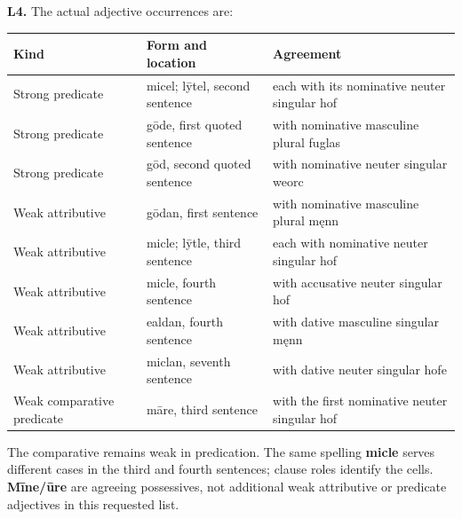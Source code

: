 \par\begin{minipage}{\linewidth}\raggedright
\textbf{L4.} The actual adjective occurrences are:

\par\begingroup
\fontsize{10.5}{13.2}\selectfont
\setlength{\LTleft}{0pt}\setlength{\LTright}{\fill}
\noindent
\begin{tabular}{@{}>{\raggedright\arraybackslash}p{34.47mm}>{\raggedright\arraybackslash}p{33.89mm}>{\raggedright\arraybackslash}p{50.01mm}@{}}
\toprule
\textbf{Kind} & \textbf{Form and location} & \textbf{Agreement} \\
\midrule
Strong predicate & micel; lȳtel, second sentence & each with its nominative neuter singular hof \\
Strong predicate & gōde, first quoted sentence & with nominative masculine plural fuglas \\
Strong predicate & gōd, second quoted sentence & with nominative neuter singular weorc \\
Weak attributive & gōdan, first sentence & with nominative masculine plural męnn \\
Weak attributive & micle; lȳtle, third sentence & each with nominative neuter singular hof \\
Weak attributive & micle, fourth sentence & with accusative neuter singular hof \\
Weak attributive & ealdan, fourth sentence & with dative masculine singular męnn \\
Weak attributive & miclan, seventh sentence & with dative neuter singular hofe \\
Weak comparative predicate & māre, third sentence & with the first nominative neuter singular hof \\
\bottomrule
\end{tabular}
\par\endgroup

The comparative remains weak in predication. The same spelling \textbf{micle} serves different cases in the third and fourth sentences; clause roles identify the cells. \textbf{Mīne/\allowbreak{}ūre} are agreeing possessives, not additional weak attributive or predicate adjectives in this requested list.

\end{minipage}\par\addvspace{4pt}

